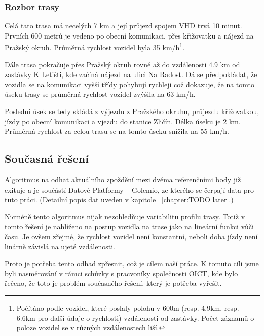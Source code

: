 \subsubsection{Rozbor trasy}

Celá tato trasa má necelých 7 km a její průjezd spojem VHD trvá 10 minut. Prvních 600 metrů je vedeno po obecní komunikaci, přes křižovatku a nájezd na Pražský okruh. Průměrná rychlost vozidel byla 35 km/h\footnote{Počítáno podle vozidel, které poslaly polohu v 600m (resp. 4.9km, resp. 6.6km pro další údaje o rychlosti) vzdálenosti od zastávky. Počet záznamů o poloze vozidel se v různých vzdálenostech liší.}.

\bigbreak

Dále trasa pokračuje přes Pražský okruh rovně až do vzdálenosti 4.9 km od zastávky K Letišti, kde začíná nájezd na ulici Na Radost. Dá se předpokládat, že vozidla se na komunikaci vyšší třídy pohybují rychleji což dokazuje, že na tomto úseku trasy se průměrná rychlost vozidel zvýšila na 63 km/h.

\bigbreak

Poslední úsek se tedy skládá z výjezdu z Pražského okruhu, průjezdu křižovatkou, jízdy po obecní komunikaci a vjezdu do stanice Zličín. Délka úseku je 2 km. Průměrná rychlost za celou trasu se na tomto úseku snížila na 55 km/h.


\subsection{Současná řešení}

Algoritmus na odhat aktuálního zpoždění mezi dvěma referenčními body již exituje a je součástí Datové Platformy -- Golemio, ze kterého se čerpají data pro tuto práci. (Detailní popis dat uveden v kapitole ~\ref{chapter:TODO later}.)

\bigbreak

Nicméně tento algoritmus nijak nezohledňuje variabilitu profilu trasy. Totiž v tomto řešení je nahlíženo na postup vozidla na trase jako na lineární funkci vůči času. Je ovšem zřejmé, že rychlost vozidel není konstantní, neboli doba jízdy není linárně závislá na ujeté vzdálenosti.

\bigbreak

Proto je potřeba tento odhad zpřesnit, což je cílem naší práce. K tomuto cíli jsme byli nasměrování v rámci schůzky s pracvoníky společnosti OICT, kde bylo řečeno, že toto je problém současného řešení, který je potřeba vyřešit.



